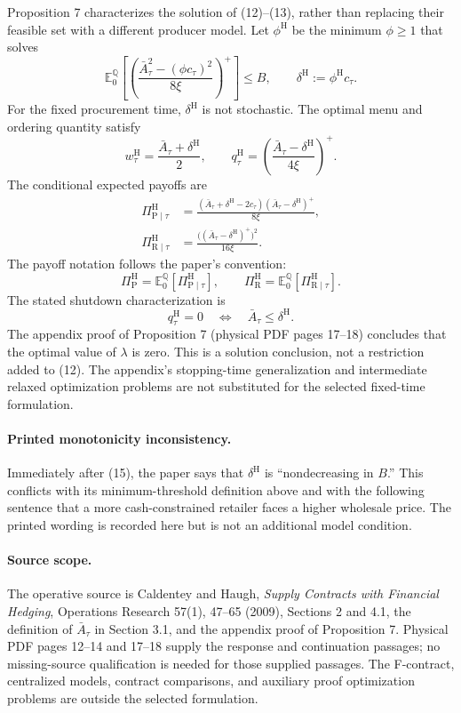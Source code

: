 \documentclass{article}
\begin{document}
Proposition 7 characterizes the solution of (12)--(13), rather than
replacing their feasible set with a different producer model. Let
$\phi^{\mathrm H}$ be the minimum $\phi\geqslant1$ that solves
\[
\mathbb E_0^{\mathbb Q}\left[
\left(\frac{\bar A_\tau^2-(\phi c_\tau)^2}{8\xi}\right)^+
\right]\leqslant B,
\qquad
\delta^{\mathrm H}:=\phi^{\mathrm H}c_\tau.
\]
For the fixed procurement time, $\delta^{\mathrm H}$ is not stochastic.
The optimal menu and ordering quantity satisfy
\begin{equation}
w_\tau^{\mathrm H}=\frac{\bar A_\tau+\delta^{\mathrm H}}{2},
\qquad
q_\tau^{\mathrm H}=
\left(\frac{\bar A_\tau-\delta^{\mathrm H}}{4\xi}\right)^+.
\tag{14}
\end{equation}
The conditional expected payoffs are
\begin{equation}
\begin{aligned}
\Pi_{\mathrm P\mid\tau}^{\mathrm H}
&=\frac{(\bar A_\tau+\delta^{\mathrm H}-2c_\tau)
(\bar A_\tau-\delta^{\mathrm H})^+}{8\xi},\\
\Pi_{\mathrm R\mid\tau}^{\mathrm H}
&=\frac{\big((\bar A_\tau-\delta^{\mathrm H})^+\big)^2}{16\xi}.
\end{aligned}
\tag{15}
\end{equation}
The payoff notation follows the paper's convention:
\[
\Pi_{\mathrm P}^{\mathrm H}
=\mathbb E_0^{\mathbb Q}[\Pi_{\mathrm P\mid\tau}^{\mathrm H}],
\qquad
\Pi_{\mathrm R}^{\mathrm H}
=\mathbb E_0^{\mathbb Q}[\Pi_{\mathrm R\mid\tau}^{\mathrm H}].
\]
The stated shutdown characterization is
\[
q_\tau^{\mathrm H}=0
\quad\Longleftrightarrow\quad
\bar A_\tau\leqslant\delta^{\mathrm H}.
\]
The appendix proof of Proposition 7 (physical PDF pages 17--18)
concludes that the optimal value of $\lambda$ is zero. This is a solution
conclusion, not a restriction added to (12). The appendix's stopping-time
generalization and intermediate relaxed optimization problems are not
substituted for the selected fixed-time formulation.

\paragraph{Printed monotonicity inconsistency.}
Immediately after (15), the paper says that $\delta^{\mathrm H}$ is
``nondecreasing in $B$.'' This conflicts with its minimum-threshold
definition above and with the following sentence that a more
cash-constrained retailer faces a higher wholesale price. The printed
wording is recorded here but is not an additional model condition.

\paragraph{Source scope.}
The operative source is Caldentey and Haugh, \emph{Supply Contracts with
Financial Hedging}, Operations Research 57(1), 47--65 (2009),
Sections 2 and 4.1, the definition of $\bar A_\tau$ in Section 3.1,
and the appendix proof of Proposition 7. Physical PDF pages 12--14 and
17--18 supply the response and continuation passages; no missing-source
qualification is needed for those supplied passages. The F-contract,
centralized models, contract comparisons, and auxiliary proof
optimization problems are outside the selected formulation.
\end{document}
